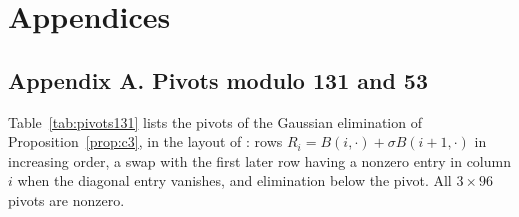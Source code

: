 \documentclass[11pt]{article}
\theoremstyle{definition}
\begin{document}
\clearpage
\section*{Appendices}

\subsection*{Appendix A. Pivots modulo 131 and 53}

Table~\ref{tab:pivots131} lists the pivots of the Gaussian elimination of Proposition~\ref{prop:c3}, in the layout of \cite[Table~1]{OAI}: rows $R_i=B(i,\cdot)+\sigma B(i+1,\cdot)$ in increasing order, a swap with the first later row having a nonzero entry in column $i$ when the diagonal entry vanishes, and elimination below the pivot. All $3\times96$ pivots are nonzero.
\end{document}
